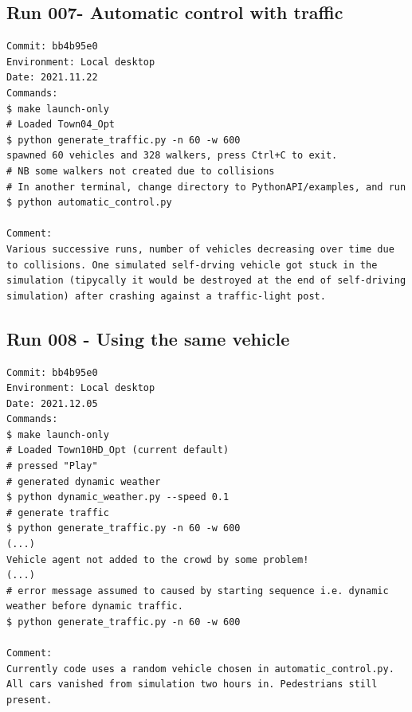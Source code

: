 \subsection{Run 007- Automatic control with traffic}
\label{app_res:007}
\begin{verbatim}
Commit: bb4b95e0
Environment: Local desktop
Date: 2021.11.22
Commands:
$ make launch-only
# Loaded Town04_Opt
$ python generate_traffic.py -n 60 -w 600
spawned 60 vehicles and 328 walkers, press Ctrl+C to exit.
# NB some walkers not created due to collisions
# In another terminal, change directory to PythonAPI/examples, and run
$ python automatic_control.py

Comment:
Various successive runs, number of vehicles decreasing over time due to collisions. One simulated self-drving vehicle got stuck in the simulation (tipycally it would be destroyed at the end of self-driving simulation) after crashing against a traffic-light post.
\end{verbatim}

\subsection{Run 008 - Using the same vehicle}
\label{app_res:008}
\begin{verbatim}
Commit: bb4b95e0
Environment: Local desktop
Date: 2021.12.05
Commands:
$ make launch-only
# Loaded Town10HD_Opt (current default)
# pressed "Play"
# generated dynamic weather
$ python dynamic_weather.py --speed 0.1
# generate traffic
$ python generate_traffic.py -n 60 -w 600
(...)
Vehicle agent not added to the crowd by some problem!
(...)
# error message assumed to caused by starting sequence i.e. dynamic weather before dynamic traffic.
$ python generate_traffic.py -n 60 -w 600

Comment:
Currently code uses a random vehicle chosen in automatic_control.py. All cars vanished from simulation two hours in. Pedestrians still present.
\end{verbatim}


